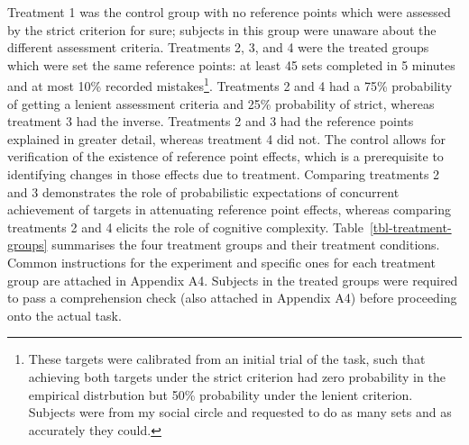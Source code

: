 \documentclass[
  12,
  letterpaper,
  DIV=11,
  numbers=noendperiod]{scrartcl}
\begin{document}
Treatment 1 was the control group with no reference points which were
assessed by the strict criterion for sure; subjects in this group were
unaware about the different assessment criteria. Treatments 2, 3, and 4
were the treated groups which were set the same reference points: at
least 45 sets completed in 5 minutes and at most 10\% recorded
mistakes\footnote{These targets were calibrated from an initial trial of
  the task, such that achieving both targets under the strict criterion
  had zero probability in the empirical distrbution but 50\% probability
  under the lenient criterion. Subjects were from my social circle and
  requested to do as many sets and as accurately they could.}.
Treatments 2 and 4 had a 75\% probability of getting a lenient
assessment criteria and 25\% probability of strict, whereas treatment 3
had the inverse. Treatments 2 and 3 had the reference points explained
in greater detail, whereas treatment 4 did not. The control allows for
verification of the existence of reference point effects, which is a
prerequisite to identifying changes in those effects due to treatment.
Comparing treatments 2 and 3 demonstrates the role of probabilistic
expectations of concurrent achievement of targets in attenuating
reference point effects, whereas comparing treatments 2 and 4 elicits
the role of cognitive complexity. Table~\ref{tbl-treatment-groups}
summarises the four treatment groups and their treatment conditions.
Common instructions for the experiment and specific ones for each
treatment group are attached in Appendix A4. Subjects in the treated
groups were required to pass a comprehension check (also attached in
Appendix A4) before proceeding onto the actual task.

\bigskip
\end{document}
